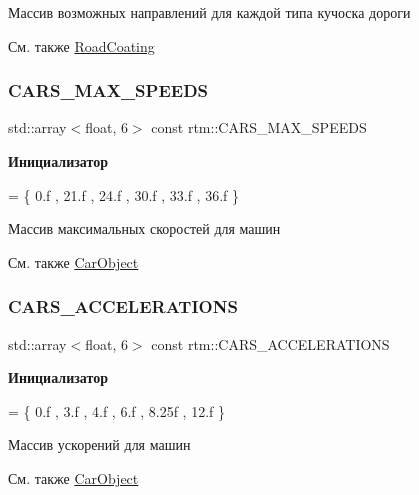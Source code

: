Массив возможных направлений для каждой типа кучоска дороги 

\begin{DoxySeeAlso}{См. также}
\hyperlink{classrtm_1_1_road_coating}{Road\+Coating} 
\end{DoxySeeAlso}
\mbox{\label{namespacertm_ab4d4feaa707f2d1eba41feae3b46451f}} 
\subsubsection{\texorpdfstring{C\+A\+R\+S\+\_\+\+M\+A\+X\+\_\+\+S\+P\+E\+E\+DS}{CARS\_MAX\_SPEEDS}}
{\footnotesize\ttfamily std\+::array$<$float, 6$>$ const rtm\+::\+C\+A\+R\+S\+\_\+\+M\+A\+X\+\_\+\+S\+P\+E\+E\+DS}

{\bfseries Инициализатор}
\begin{DoxyCode}
= \{
          0.f   
        , 21.f  
        , 24.f  
        , 30.f  
        , 33.f  
        , 36.f  
    \}
\end{DoxyCode}


Массив максимальных скоростей для машин 

\begin{DoxySeeAlso}{См. также}
\hyperlink{classrtm_1_1_car_object}{Car\+Object} 
\end{DoxySeeAlso}
\mbox{\label{namespacertm_acac83b872b644793530e7f6f4660c85e}} 
\subsubsection{\texorpdfstring{C\+A\+R\+S\+\_\+\+A\+C\+C\+E\+L\+E\+R\+A\+T\+I\+O\+NS}{CARS\_ACCELERATIONS}}
{\footnotesize\ttfamily std\+::array$<$float, 6$>$ const rtm\+::\+C\+A\+R\+S\+\_\+\+A\+C\+C\+E\+L\+E\+R\+A\+T\+I\+O\+NS}

{\bfseries Инициализатор}
\begin{DoxyCode}
= \{
          0.f   
        , 3.f   
        , 4.f   
        , 6.f   
        , 8.25f 
        , 12.f  
    \}
\end{DoxyCode}


Массив ускорений для машин 

\begin{DoxySeeAlso}{См. также}
\hyperlink{classrtm_1_1_car_object}{Car\+Object} 
\end{DoxySeeAlso}

